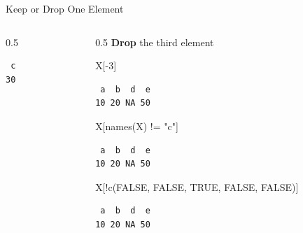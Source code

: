 \documentclass[
  ignorenonframetext,
  aspectratio=169,
]{beamer}
\newenvironment{Shaded}{\begin{snugshade}}{\end{snugshade}}
\newcommand{\ConstantTok}[1]{\textcolor[rgb]{0.56,0.35,0.01}{#1}}
\newcommand{\DecValTok}[1]{\textcolor[rgb]{0.68,0.00,0.00}{#1}}
\newcommand{\FunctionTok}[1]{\textcolor[rgb]{0.28,0.35,0.67}{#1}}
\newcommand{\NormalTok}[1]{\textcolor[rgb]{0.00,0.23,0.31}{#1}}
\newcommand{\SpecialCharTok}[1]{\textcolor[rgb]{0.37,0.37,0.37}{#1}}
\newcommand{\StringTok}[1]{\textcolor[rgb]{0.13,0.47,0.30}{#1}}
\begin{document}
\begin{frame}[fragile]{Keep or Drop One Element}
\begin{columns}[T]
\begin{column}{0.5\textwidth}
\begingroup\tiny\color{darkgray}

\begin{verbatim}
 c 
30 
\end{verbatim}

\endgroup
\end{column}

\begin{column}{0.5\textwidth}
\textbf{Drop} the third element

\begin{Shaded}
\begin{Highlighting}[]
\NormalTok{X[}\SpecialCharTok{{-}}\DecValTok{3}\NormalTok{]}
\end{Highlighting}
\end{Shaded}

\begingroup\tiny\color{darkgray}

\begin{verbatim}
 a  b  d  e 
10 20 NA 50 
\end{verbatim}

\endgroup

\begin{Shaded}
\begin{Highlighting}[]
\NormalTok{X[}\FunctionTok{names}\NormalTok{(X) }\SpecialCharTok{!=} \StringTok{"c"}\NormalTok{]}
\end{Highlighting}
\end{Shaded}

\begingroup\tiny\color{darkgray}

\begin{verbatim}
 a  b  d  e 
10 20 NA 50 
\end{verbatim}

\endgroup

\begin{Shaded}
\begin{Highlighting}[]
\NormalTok{X[}\SpecialCharTok{!}\FunctionTok{c}\NormalTok{(}\ConstantTok{FALSE}\NormalTok{, }\ConstantTok{FALSE}\NormalTok{, }\ConstantTok{TRUE}\NormalTok{, }\ConstantTok{FALSE}\NormalTok{, }\ConstantTok{FALSE}\NormalTok{)]}
\end{Highlighting}
\end{Shaded}

\begingroup\tiny\color{darkgray}

\begin{verbatim}
 a  b  d  e 
10 20 NA 50 
\end{verbatim}

\endgroup
\end{column}
\end{columns}
\end{frame}
\end{document}
